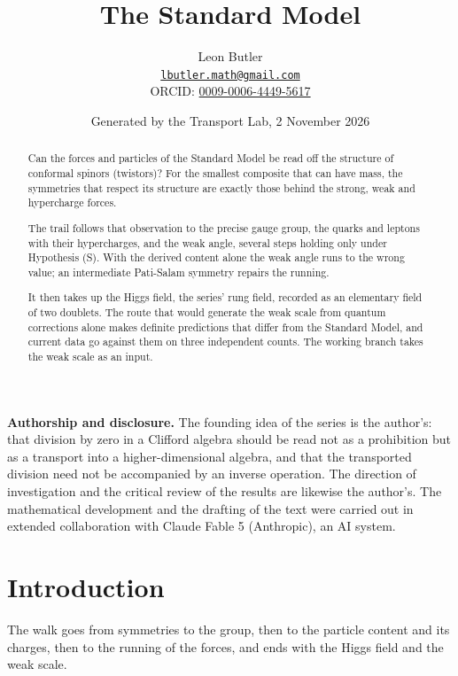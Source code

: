 \documentclass[11pt]{article}
\title{\bfseries The Standard Model}
\author{Leon Butler\\ \normalsize\href{mailto:lbutler.math@gmail.com}{\texttt{lbutler.math@gmail.com}}\\ \normalsize ORCID: \href{https://orcid.org/0009-0006-4449-5617}{0009-0006-4449-5617}}
\date{Generated by the Transport Lab, 2 November 2026}
\theoremstyle{definition}
\theoremstyle{plain}
\begin{document}
\maketitle
\begin{abstract}
\normalsize
Can the forces and particles of the Standard Model be read off the structure of conformal spinors (twistors)? For the smallest composite that can have mass, the symmetries that respect its structure are exactly those behind the strong, weak and hypercharge forces.

The trail follows that observation to the precise gauge group, the quarks and leptons with their hypercharges, and the weak angle, several steps holding only under Hypothesis (S). With the derived content alone the weak angle runs to the wrong value; an intermediate Pati-Salam symmetry repairs the running.

It then takes up the Higgs field, the series' rung field, recorded as an elementary field of two doublets. The route that would generate the weak scale from quantum corrections alone makes definite predictions that differ from the Standard Model, and current data go against them on three independent counts. The working branch takes the weak scale as an input.
\end{abstract}
\newpage
\noindent \textbf{Authorship and disclosure. }The founding idea of the series is the author's: that division by zero in a Clifford algebra should be read not as a prohibition but as a transport into a higher-dimensional algebra, and that the transported division need not be accompanied by an inverse operation. The direction of investigation and the critical review of the results are likewise the author's. The mathematical development and the drafting of the text were carried out in extended collaboration with Claude Fable 5 (Anthropic), an AI system.

\noindent{}
\newpage

\section*{Introduction}
The walk goes from symmetries to the group, then to the particle content and its charges, then to the running of the forces, and ends with the Higgs field and the weak scale.
\end{document}
